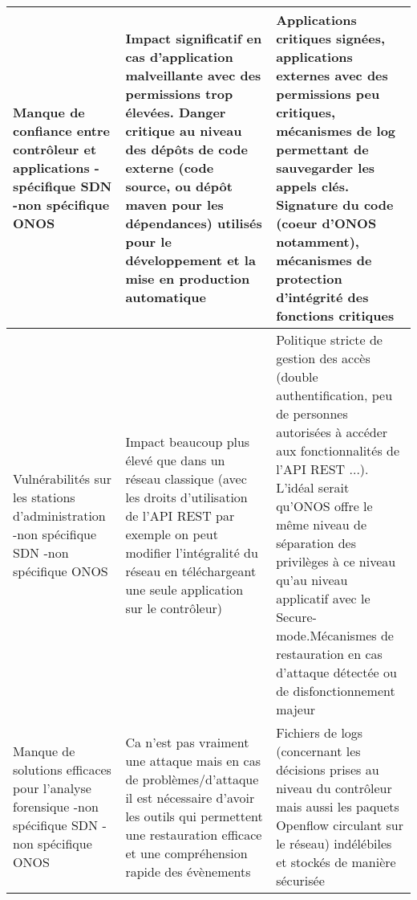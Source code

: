 \begin{small}
\begin{longtable}{| p{} | p{} | p{}|}
\hline
Manque de confiance entre contrôleur et applications \newline -spécifique SDN \newline -non spécifique ONOS & Impact significatif en cas d'application malveillante avec des permissions trop élevées. Danger critique au niveau des dépôts de code externe (code source, ou dépôt maven pour les dépendances) utilisés pour le développement et la mise en production automatique & Applications critiques signées, applications externes avec des permissions peu critiques, mécanismes de log permettant de sauvegarder les appels clés. Signature du code (coeur d'ONOS notamment), mécanismes de protection d'intégrité des fonctions critiques\\ 
\hline
Vulnérabilités sur les stations d'administration \newline -non spécifique SDN \newline -non spécifique ONOS & Impact beaucoup plus élevé que dans un réseau classique (avec les droits d'utilisation de l'API REST par exemple on peut modifier l'intégralité du réseau en téléchargeant une seule application sur le contrôleur) & Politique stricte de gestion des accès (double authentification, peu de personnes autorisées à accéder aux fonctionnalités de l'API REST ...). L'idéal serait qu'ONOS offre le même niveau de séparation des privilèges à ce niveau qu'au niveau applicatif avec le Secure-mode.\newline Mécanismes de restauration en cas d'attaque détectée ou de disfonctionnement majeur\\ 
\hline
Manque de solutions efficaces pour l'analyse forensique \newline -non spécifique SDN \newline -non spécifique ONOS & Ca n'est pas vraiment une attaque mais en cas de problèmes/d'attaque il est nécessaire d'avoir les outils qui permettent une restauration efficace et une compréhension rapide des évènements & Fichiers de logs (concernant les décisions prises au niveau du contrôleur mais aussi les paquets Openflow circulant sur le réseau) indélébiles et stockés de manière sécurisée\\ 
\hline

\end{longtable}

\end{small}

